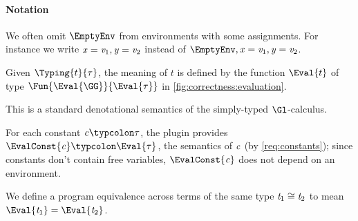 \paragraph{Notation}
We often omit \ensuremath{\EmptyEnv} from environments with some assignments.
For instance we write \ensuremath{\Varid{x}\mathrel{=}\Varid{v}_{1},\Varid{y}\mathrel{=}\Varid{v}_{2}} instead of \ensuremath{\EmptyEnv,\Varid{x}\mathrel{=}\Varid{v}_{1},\Varid{y}\mathrel{=}\Varid{v}_{2}}.

\begin{definition}[Evaluation]
  \label{def:evaluation}
  Given $\Typing{t}{\tau}$, the meaning of $t$ is defined by the
  function $\Eval{t}$ of type $\Fun{\Eval{\GG}}{\Eval{\tau}}$
  in \cref{fig:correctness:evaluation}.
\end{definition}

This is a standard denotational semantics of the simply-typed
$\Gl$-calculus.

For each constant \ensuremath{\Varid{c}\typcolon\tau}, the plugin provides \ensuremath{\EvalConst{\Varid{c}}\typcolon\Eval{\tau}}, the semantics of \ensuremath{\Varid{c}} (by \cref{req:constants}); since
constants don't contain free variables, \ensuremath{\EvalConst{\Varid{c}}} does not
depend on an environment.


We define a program equivalence across terms of the same type \ensuremath{\Varid{t}_{1}\cong\Varid{t}_{2}} to mean \ensuremath{\Eval{\Varid{t}_{1}}\mathrel{=}\Eval{\Varid{t}_{2}}}.

